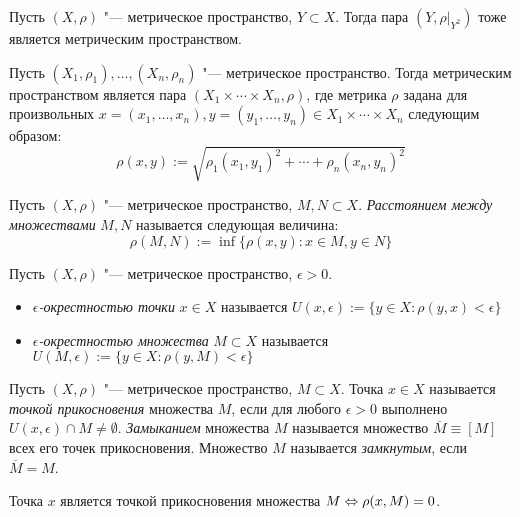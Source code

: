 \begin{note}
	Пусть $(X, \rho)$ "--- метрическое пространство, $Y \subset X$. Тогда пара $(Y, \rho|_{Y^2})$ тоже является метрическим пространством.
\end{note}

\begin{note}
	Пусть $(X_1, \rho_1), \dotsc, (X_n, \rho_n)$ "--- метрическое пространство. Тогда метрическим пространством является пара $(X_1 \times \dotsb \times X_n, \rho)$, где метрика $\rho$ задана для произвольных $x = (x_1, \dotsc, x_n), y = (y_1, \dotsc, y_n) \in X_1 \times \dotsb \times X_n$ следующим образом:
	\[\rho(x, y) := \sqrt{\rho_1(x_1, y_1)^2 + \dotsb + \rho_n(x_n, y_n)^2}\]
\end{note}

\begin{definition}
	Пусть $(X, \rho)$ "--- метрическое пространство, $M, N \subset X$. \textit{Расстоянием между множествами} $M, N$ называется следующая величина:
	\[\rho(M, N) := \inf\{\rho(x, y): x \in M, y \in N\}\]
\end{definition}

\begin{definition}
	Пусть $(X, \rho)$ "--- метрическое пространство, $\epsilon > 0$.
	\begin{itemize}
		\item \textit{$\epsilon$-окрестностью точки} $x \in X$ называется $U(x, \epsilon) := \{y \in X: \rho(y, x) < \epsilon\}$
		
		\item \textit{$\epsilon$-окрестностью множества} $M \subset X$ называется $U(M, \epsilon) := \{y \in X: \rho(y, M) < \epsilon\}$
	\end{itemize}
\end{definition}

\begin{definition}
	Пусть $(X, \rho)$ "--- метрическое пространство, $M \subset X$. Точка $x \in X$ называется \textit{точкой прикосновения} множества $M$, если для любого $\epsilon > 0$ выполнено $U(x, \epsilon) \cap M \ne \emptyset$. \textit{Замыканием} множества $M$ называется множество $\overline M \equiv [M]$ всех его точек прикосновения. Множество $M$ называется \textit{замкнутым}, если $\overline M = M$.
\end{definition}

\begin{note}
	Точка $x$ является точкой прикосновения множества $M \Leftrightarrow \rho(x, M) = 0$.
\end{note}

